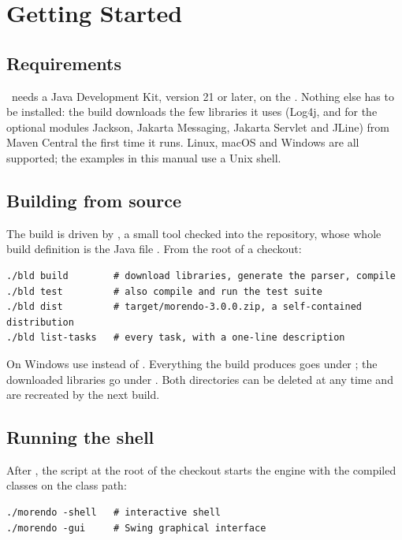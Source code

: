 \chapter{Getting Started}
\label{ch:getting-started}

\section{Requirements}

\Morendo\ needs a Java Development Kit, version 21 or later, on the
. Nothing else has to be installed: the build downloads the few
libraries it uses (Log4j, and for the optional modules Jackson, Jakarta
Messaging, Jakarta Servlet and JLine) from Maven Central the first time it
runs. Linux, macOS and Windows are all supported; the examples in this
manual use a Unix shell.

\section{Building from source}

The build is driven by , a small tool checked into the repository,
whose whole build definition is the Java file .
From the root of a checkout:

\begin{lstlisting}[style=shell]
./bld build        # download libraries, generate the parser, compile
./bld test         # also compile and run the test suite
./bld dist         # target/morendo-3.0.0.zip, a self-contained distribution
./bld list-tasks   # every task, with a one-line description
\end{lstlisting}

On Windows use  instead of . Everything the build
produces goes under ; the downloaded libraries go under
. Both directories can be deleted at any time and are recreated
by the next build.

\section{Running the shell}

After , the  script at the root of the checkout
starts the engine with the compiled classes on the class path:

\begin{lstlisting}[style=shell]
./morendo -shell   # interactive shell
./morendo -gui     # Swing graphical interface
\end{lstlisting}

